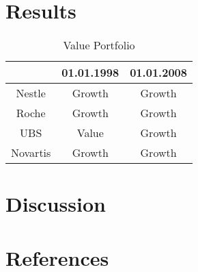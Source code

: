 \documentclass{article}
\begin{document}
\section{Results}

\begin{table} [!h] \centering 
  \begin{threeparttable}
    \caption{Value Portfolio}
     \begin{tabular}{ccc}
        \toprule
			    	& 01.01.1998 & 01.01.2008\\ 
		\midrule
		Nestle  	& Growth 	& Growth     \\
		Roche 		& Growth 	& Growth        \\ 
		UBS 		& Value 	& Growth \\
		Novartis 	& Growth 	& Growth
		\\ 
		\bottomrule

\end{tabular}
\end{threeparttable}
\end{table}

\blindtext
\newpage

\section{Discussion}
\blindtext
\newpage







\section{References}
\begingroup
\renewcommand{\section}[2]{}

\endgroup

\newpage
\end{document}

